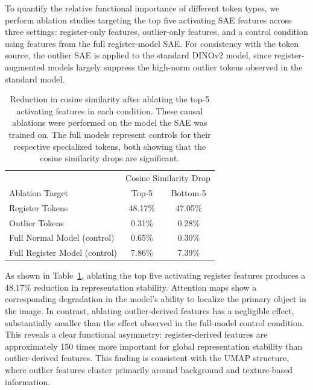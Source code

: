 \documentclass{article}
\theoremstyle{plain}
\theoremstyle{definition}
\theoremstyle{remark}
\begin{document}
To quantify the relative functional importance of different token types, we perform ablation studies targeting the top five activating SAE features across three settings: register-only features, outlier-only features, and a control condition using features from the full register-model SAE. For consistency with the token source, the outlier SAE is applied to the standard DINOv2 model, since register-augmented models largely suppress the high-norm outlier tokens observed in the standard model.

\begin{table}[h]
      \centering
        \begin{tabular}{l c c}
    \hline
    & \multicolumn{2}{c}{Cosine Similarity Drop} \\
    
    Ablation Target & Top-5 & Bottom-5 \\ \hline
    Register Tokens & 48.17\% & 47.05\% \\
    Outlier Tokens  & 0.31\%  & 0.28\%  \\
    Full Normal Model (control)     & 0.65\%  & 0.30\%  \\
    Full Register Model (control)     & 7.86\%  & 7.39\%  \\ \hline
\end{tabular}
      \caption{Reduction in cosine similarity after ablating the top-5 activating features in each condition. These causal ablations were performed on the model the SAE was trained on. The full models represent controls for their respective specialized tokens, both showing that the cosine similarity drops are significant.}
      \label{tab:cosine_sim}
  \end{table}


As shown in Table~\ref{tab:cosine_sim}, ablating the top five activating register features produces a 48.17\% reduction in representation stability. Attention maps show a corresponding degradation in the model's ability to localize the primary object in the image. In contrast, ablating outlier-derived features has a negligible effect, substantially smaller than the effect observed in the full-model control condition. This reveals a clear functional asymmetry: register-derived features are approximately 150 times more important for global representation stability than outlier-derived features. This finding is consistent with the UMAP structure, where outlier features cluster primarily around background and texture-based information.
\end{document}
